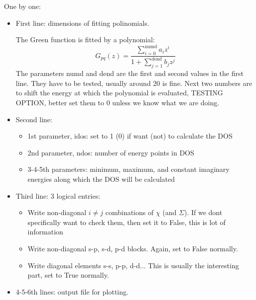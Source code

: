 \documentclass[a4paper,10pt,fullpage]{report}
\begin{document}
One by one:

\begin{itemize}

\item First line: dimensions of fitting polinomials.

The Green function is fitted by a polynomial:
\begin{equation}
G_{pq}(z) = \dfrac{\sum_{i=0}^{\text{numd}}a_{i}z^{i}}
{1+\sum_{j=1}^{\text{dend}}b_{j}z^{j}}
\end{equation}
%
The parameters numd and dend are the first and second values in the first line. 
They have to be tested, usually around 20 is fine. Next two numbers are to
shift the energy at which the polynomial is evaluated, TESTING OPTION, better set them
to 0 unless we know what we are doing.

\item Second line:

\begin{itemize}

\item 1st parameter, idos: set to 1 (0) if want (not) to calculate the DOS 

\item 2nd parameter, ndos: number of energy points in DOS 

\item 3-4-5th parameters: minimum, maximum, and constant imaginary energies along which the 
DOS will be calculated

\end{itemize}



\item Third line: 3 logical entries:

\begin{itemize}

\item Write non-diagonal 
$i\neq j$ combinations of $\chi$ (and $\Sigma$). If we dont specifically want
to check them, then set it to False, this is lot of information

\item Write non-diagonal s-p, s-d, p-d blocks. Again, set to False normally.

\item Write diagonal elements s-s, p-p, d-d... This is usually the interesting part,
set to True normally. 

\end{itemize}

\item 4-5-6th lines: output file for plotting.


\end{itemize}
\end{document}
